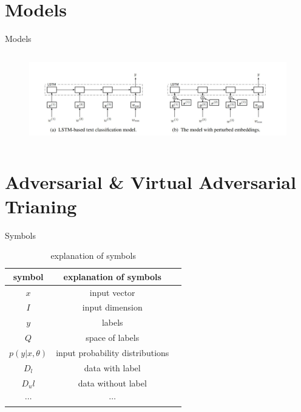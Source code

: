 
\section{Models}

\begin{frame}[fragile]{Models}
	\begin{columns}[onlytextwidth]
		
		\begin{figure}
			\includegraphics[height=0.5\textheight]{model.jpg}
		\end{figure}

		
	\end{columns}
	
	
\end{frame}
\section{Adversarial \& Virtual Adversarial Trianing}


\begin{frame}[fragile]{Symbols}

	\begin{table}[!htbp]
		\caption{ explanation of symbols}\label{tab:01} \centering
		\begin{tabular}{ccc}
			\toprule[1.5pt]
			symbol &  explanation of symbols\\ 
			\midrule[1pt]
			$x$ &  input vector \\
			$I$ &  input dimension \\
			$y$ &  labels \\
			$Q$ &  space of labels \\
			$p(y| x,\theta )$ & input probability distributions\\
			$D_l$ &  data with label\\
			$D_ul$ & data without label \\
			$\cdots$ & $\cdots$ \\
			\bottomrule[1.5pt]
		\end{tabular}
	\end{table}
	
\end{frame}

